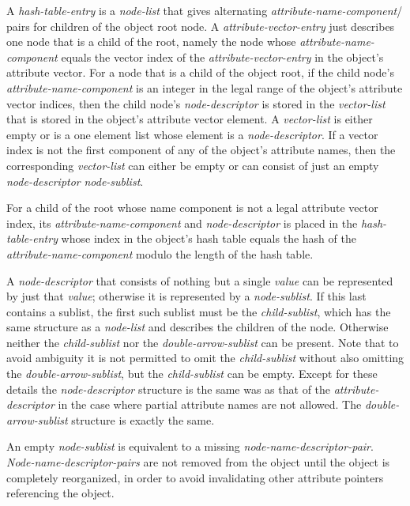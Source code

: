 \documentclass[12pt]{article}
\newcommand{\EOL}{\penalty \exhyphenpenalty}
\begin{document}
A {\em hash-table-entry} is a {\em node-list} that gives alternating
{\em attribute-name-component}/\EOL {\em node-\EOL de\-scrip\-tor} pairs for
children of the object root node.  A {\em attribute-vector-entry}
just describes one node that is a child of the root, namely the node
whose {\em attribute-name-component} equals the vector index of the
{\em attribute-vector-entry} in the object's attribute vector.
For a node that is a child of the object root,
if the child node's {\em attribute-name-component} is an integer in the legal
range of the object's attribute vector indices, then the child node's
{\em node-descriptor} is stored in the {\em vector-list}
that is stored in the object's attribute vector element.
A {\em vector-list} is either empty or is a one element list whose element is a
{\em node-descriptor}.  If a vector index is not the first component of
any of the object's attribute names, then the corresponding {\em vector-list}
can either be empty or can consist of just an empty {\em node-descriptor}
{\em node-sublist}.

For a child of the root whose name component is not a legal attribute
vector index, its {\em attribute-name-component} and
{\em node-descriptor} is placed in the {\em hash-table-entry}
whose index in the object's hash table equals the hash of the
{\em attribute-name-component} modulo the length of the hash table.

A {\em node-descriptor} that consists of nothing but a single {\em value}
can be represented by just that {\em value}; otherwise it is represented
by a {\em node-sublist}.  If this last contains a sublist, the first
such sublist must
be the {\em child-sublist}, which has the same structure as a {\em node-list}
and describes the children of the node.  Otherwise neither the
{\em child-sublist} nor the {\em double-arrow-sublist} can be present.
Note that to avoid ambiguity it is not permitted to omit the
{\em child-sublist} without also omitting
the {\em double-arrow-sublist}, but the
{\em child-sublist} can be empty.  Except for these details
the {\em node-descriptor} structure is the same was as that of the
{\em attribute-descriptor} in the case where partial attribute names are
not allowed.  The {\em double-arrow-sublist} structure is exactly
the same.

An empty {\em node-sublist} is equivalent to a missing
{\em node-name-descriptor-pair}.
{\em Node-name-descriptor-pairs} are not
removed from the object until the object is completely reorganized,
in order to avoid invalidating other attribute pointers referencing the object.
\end{document}
